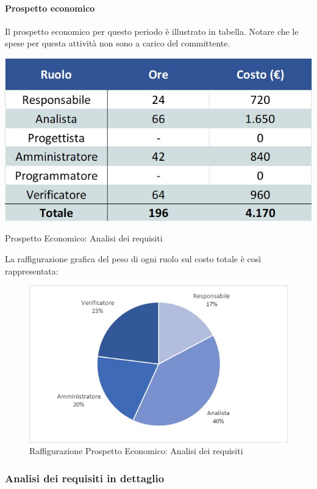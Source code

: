 \paragraph{Prospetto economico}
Il prospetto economico per questo periodo è illustrato in tabella. Notare che le spese per questa attività non sono a carico del committente.
\begin{table}[H]
	\centerline{\includegraphics[scale=0.7]{img/Preventivo/AnalisiRequisitiEconomico.jpg}}
	\caption{Prospetto Economico: Analisi dei requisiti}
	\clearpage
\end{table}
La raffigurazione grafica del peso di ogni ruolo sul costo totale è così rappresentata: 
\begin{figure}[H]
	\centerline{\includegraphics[scale=0.9]{img/Preventivo/Torte/AnalisiRequisiti.jpg}}
	\caption{Raffigurazione Prospetto Economico: Analisi dei requisiti}
	\clearpage
\end{figure}
\newpage
\subsubsection{Analisi dei requisiti in dettaglio}
